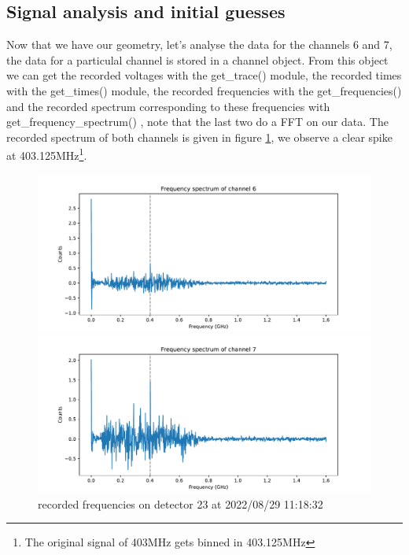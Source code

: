 \documentclass[11pt,a4paper,faculty=we,language=en,doctype=report]{cls/ugent-doc}
\begin{document}
\subsection{Signal analysis and initial guesses}
Now that we have our geometry, let's analyse the data for the channels 6 and 7,
the data for a particulal channel is stored in a channel object. From this
object we can get the recorded voltages with the get\_trace() module, the
recorded times with the get\_times() module, the recorded frequencies with the
get\_frequencies() and the recorded spectrum corresponding to these frequencies
with get\_frequency\_spectrum() , note that the last two do a FFT on our data.
The recorded spectrum of both channels is given in figure \ref{fig:freqs67}, we
observe a clear spike at 403.125MHz\footnote{The original signal of 403MHz gets binned
in 403.125MHz}.
\begin{figure}
	\begin{minipage}{0.49\textwidth}
		\includegraphics[width=\textwidth]{23-489-6-freq.pdf}
	\end{minipage}
	\begin{minipage}{0.49\textwidth}
		\includegraphics[width=\textwidth]{23-489-7-freq.pdf}
	\end{minipage}
	\caption{recorded frequencies on detector 23 at 2022/08/29 11:18:32}
	\label{fig:freqs67}
\end{figure}
\end{document}
